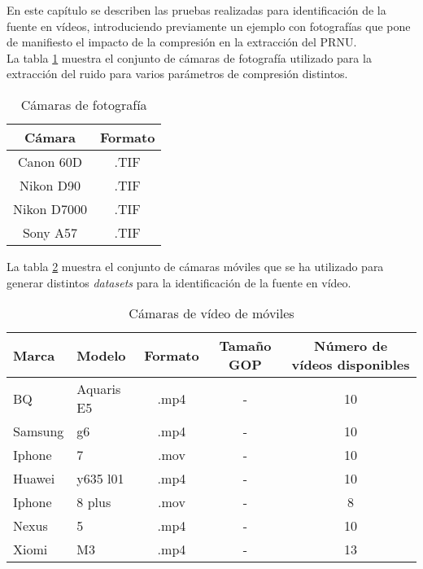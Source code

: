 En este capítulo se describen las pruebas realizadas para identificación de la fuente en vídeos, introduciendo previamente un ejemplo con fotografías que pone de manifiesto el impacto de la compresión en la extracción del PRNU. \\

La tabla \ref{tabla:fotos} muestra el conjunto de cámaras de fotografía utilizado para la extracción del ruido para varios parámetros de compresión distintos. \\

\begin{table}[!htb]
    \centering
        \begin{tabular}{|c|c|}
        \hline
        \rowcolor[gray]{0.9}\textbf{Cámara} & \textbf{Formato} \\ 
        \hline
        Canon 60D & .TIF \\ 
        \hline
        Nikon D90 & .TIF \\ 
        \hline
        Nikon D7000 & .TIF \\ 
        \hline
        Sony A57 & .TIF \\ 
        \hline
        \end{tabular}
    \caption{Cámaras de fotografía}
    \label{tabla:fotos}
\end{table}

La tabla \ref{tabla:videos} muestra el conjunto de cámaras móviles que se ha utilizado para generar distintos \textit{datasets} para la identificación de la fuente en vídeo. \\

\begin{table}[!htb]
    \centering
        \begin{tabular}{|l|l|c|c|c|}
        \hline
        \rowcolor[gray]{0.9}
        \textbf{Marca} & \textbf{Modelo} & \textbf{Formato} & \textbf{Tama\~no GOP} & \textbf{Número de vídeos disponibles} \\ \hline
        BQ & Aquaris E5 & .mp4 & - & 10 \\ \hline
        Samsung & g6 & .mp4 & - & 10 \\ \hline
        Iphone & 7 & .mov & - & 10 \\ \hline
        Huawei & y635 l01 & .mp4 & - & 10 \\ \hline
        Iphone & 8 plus & .mov & - & 8 \\ \hline
        Nexus & 5 & .mp4 & - & 10 \\ \hline
        Xiomi & M3 & .mp4 & - & 13 \\ \hline
        \end{tabular}
    \caption{Cámaras de vídeo de móviles}
    \label{tabla:videos}
\end{table}

